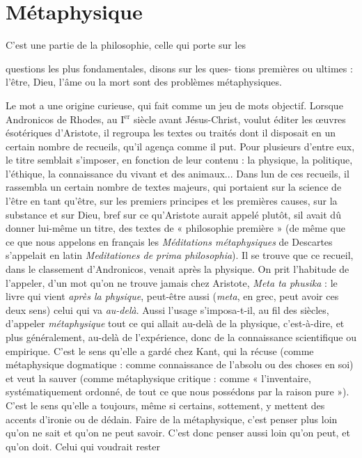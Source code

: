 \section{Métaphysique}
C’est une partie de la philosophie, celle qui porte sur les

questions les plus fondamentales, disons sur les ques-
tions premières ou ultimes : l’être, Dieu, l’âme ou la mort sont des problèmes
métaphysiques.

Le mot a une origine curieuse, qui fait comme un jeu de mots objectif.
Lorsque Andronicos de Rhodes, au {\footnotesize I$^\text{er}$} siècle avant Jésus-Christ, voulut éditer les
œuvres ésotériques d’Aristote, il regroupa les textes ou traités dont il disposait
en un certain nombre de recueils, qu’il agença comme il put. Pour plusieurs
d’entre eux, le titre semblait s'imposer, en fonction de leur contenu : la physique,
la politique, l'éthique, la connaissance du vivant et des animaux... Dans
lun de ces recueils, il rassembla un certain nombre de textes majeurs, qui portaient
sur la science de l’être en tant qu'être, sur les premiers principes et les
premières causes, sur la substance et sur Dieu, bref sur ce qu’Aristote aurait
appelé plutôt, sil avait dû donner lui-même un titre, des textes de
« philosophie première » (de même que ce que nous appelons en français les
{\it Méditations métaphysiques} de Descartes s’appelait en latin {\it Meditationes de prima
philosophia}). Il se trouve que ce recueil, dans le classement d’Andronicos, venait
après la physique. On prit l'habitude de l’appeler, d’un mot qu’on ne trouve
jamais chez Aristote, {\it Meta ta phusika} : le livre qui vient {\it après la physique}, peut-être
aussi ({\it meta}, en grec, peut avoir ces deux sens) celui qui va {\it au-delà}. Aussi
l'usage s’imposa-t-il, au fil des siècles, d'appeler {\it métaphysique} tout ce qui allait
au-delà de la physique, c’est-à-dire, et plus généralement, au-delà de l’expérience,
donc de la connaissance scientifique ou empirique. C’est le sens qu’elle
a gardé chez Kant, qui la récuse (comme métaphysique dogmatique : comme
connaissance de l’absolu ou des choses en soi) et veut la sauver (comme métaphysique
critique : comme « l’inventaire, systématiquement ordonné, de tout
ce que nous possédons par la raison pure »). C’est le sens qu’elle a toujours,
même si certains, sottement, y mettent des accents d’ironie ou de dédain. Faire
de la métaphysique, c’est penser plus loin qu’on ne sait et qu’on ne peut savoir.
C’est donc penser aussi loin qu’on peut, et qu’on doit. Celui qui voudrait rester
